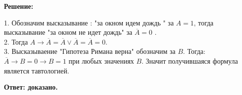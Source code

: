\documentclass[a4paper,12pt]{article} %
\begin{document}
\begin{center}
\bfseries
{\Large Решение: }
\end{center}
1. Обозначим высказывание : "за окном идем дождь "\hspace{1mm} за $A = 1$, тогда высказывание "за окном не идет дождь"\hspace{1mm} за $\overline{A} = 0$ .\\
2. Тогда $A \rightarrow \overline{A} = \overline{A} \vee \overline{A} = \overline{A} = 0$.\\
3. Высказываение "Гипотеза Римана верна" обозначим за $B$. Тогда:\\
$\overline{A} \rightarrow B = 0 \rightarrow B = 1$ при любых значениях $B$. Значит получившаяся формула является тавтологией.




\begin{flushright}
\begin{large}
\textbf {Ответ: доказано. }
\end{large}
\end{flushright}
\end{document}
